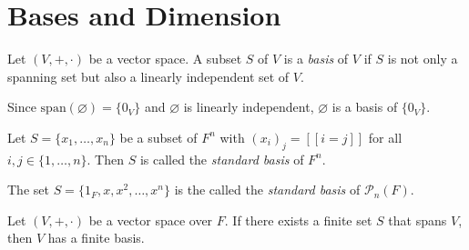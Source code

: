 \section{Bases and Dimension}
\begin{definition}\label{def:basis}
  Let $(V, +, \cdot)$ be a vector space. A subset $S$ of $V$ is a \emph{basis}
  of $V$ if $S$ is not only a spanning set but also a linearly independent set
  of $V$.
\end{definition}

\begin{example}
  Since $\mathrm{span}(\varnothing) = \{0_V\}$ and $\varnothing$ is linearly
  independent, $\varnothing$ is a basis of $\{0_V\}$.
\end{example}
\begin{example}
  Let $S = \{x_1, \dots, x_n\}$ be a subset of $F^n$ with
  $(x_i)_j = [\![i = j]\!]$ for all $i, j \in \{1, \dots, n\}$.
  Then $S$ is called the \emph{standard basis} of $F^n$.
\end{example}
\begin{example}
  The set $S = \{1_F, x, x^2, \dots, x^n\}$ is the called the
  \emph{standard basis} of $\mathcal{P}_n(F)$.
\end{example}

\begin{theorem}\label{thm:basis-existence}
  Let $(V, +, \cdot)$ be a vector space over $F$.
  If there exists a finite set $S$ that spans $V$,
  then $V$ has a finite basis.
\end{theorem}

